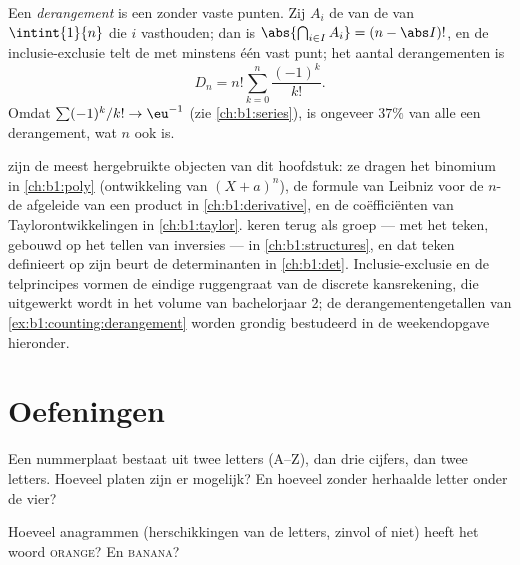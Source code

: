 \begin{example}[Derangementen]\label{ex:b1:counting:derangement}
Een \emph{derangement} is een  zonder vaste punten. Zij $A_i$
de  van de  van $\intint{1}{n}$ die $i$ vasthouden;
dan is $\abs{\bigcap_{i \in I} A_i} = (n - \abs I)!$, en de
inclusie-exclusie telt de  met minstens één vast punt; het
aantal derangementen is
\[
D_n = n! \sum_{k=0}^{n} \frac{(-1)^k}{k!} .
\]
Omdat $\sum (-1)^k / k! \to \eu^{-1}$ (zie \cref{ch:b1:series}), is
ongeveer $37\%$ van alle  een derangement, wat $n$ ook is.
\end{example}

\begin{remark}\label{rem:b1:counting:whereused}
 zijn de meest hergebruikte objecten van dit
hoofdstuk: ze dragen het binomium in \cref{ch:b1:poly} (ontwikkeling van
$(X + a)^n$), de formule van Leibniz voor de $n$-de afgeleide van een
product in \cref{ch:b1:derivative}, en de coëfficiënten van
Taylorontwikkelingen in \cref{ch:b1:taylor}.  keren terug als
groep --- met het teken, gebouwd op het tellen van inversies --- in
\cref{ch:b1:structures}, en dat teken definieert op zijn beurt de
determinanten in \cref{ch:b1:det}. Inclusie-exclusie en de telprincipes
vormen de eindige ruggengraat van de discrete kansrekening, die
uitgewerkt wordt in het volume van bachelorjaar 2; de
derangementengetallen van \cref{ex:b1:counting:derangement} worden
grondig bestudeerd in de weekendopgave hieronder.
\end{remark}

\section{Oefeningen}

\begin{exercise}[$\star$]\label{exo:b1:counting:1}
Een nummerplaat bestaat uit twee letters (A--Z), dan drie cijfers, dan
twee letters. Hoeveel platen zijn er mogelijk? En hoeveel zonder herhaalde
letter onder de vier?
\end{exercise}

\begin{exercise}[$\star$]\label{exo:b1:counting:2}
Hoeveel anagrammen (herschikkingen van de letters, zinvol of niet) heeft
het woord \textsc{orange}? En \textsc{banana}?
\end{exercise}

